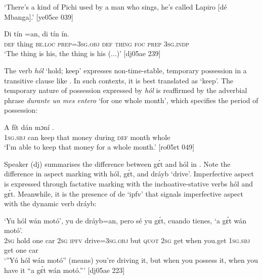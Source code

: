 \glt ‘There’s a kind of Pichi used by a man who sings, he’s called 
Lapiro [dé Mbanga].’ [ye05ce 039]
\z


\ea%
    \label{ex:key:822}
    \gll Di  tín        =an,    di  tín       ín.\\
\textsc{def}  thing  \textsc{be.loc}  \textsc{prep}=\textsc{3sg.obj}  \textsc{def}  \textsc{thing}  \textsc{foc}  \textsc{prep}  \textsc{3sg.indp}\\

\glt ‘The thing is his, the thing is his (...)’ [dj05ae 239]
\z

The verb \textit{hól} ‘hold; keep’ expresses non-time-stable, temporary possession in a transitive clause like . In such contexts, it is best translated as ‘keep’. The temporary nature of possession expressed by \textit{hól} is reaffirmed by the adverbial phrase \textit{durante un mes entero} ‘for one whole month’, which specifies the period of possession: 


\ea%
    \label{ex:key:823}
    \gll \MakeUppercase{A}   fít      dán    mɔní          .\\
\textsc{1sg.sbj}  can  keep  that    money  during  \textsc{def}  month  whole\\

\glt ‘I’m able to keep that money for a whole month.’ [ro05rt 049]
\z

Speaker (dj) summarises the difference between gɛ́t and hól in . Note the difference in aspect marking with hól, gɛ́t, and dráyb ‘drive’. Imperfective{\fff} aspect is expressed through factative{\fff} marking with the inchoative-stative verbs hól and gɛ́t. Meanwhile, it is the presence of de ‘ipfv’ that signals imperfective aspect with the dynamic verb dráyb:


\ea%
    \label{ex:key:824}
    \gll ‘Yu  hól  wán  motó’,  yu  de  dráyb=an,  pero  sé    yu  gɛ́t,
cuando  tienes,    ‘a    gɛ́t  wán    motó’.\\
\textsc{2sg}  hold  one  car    \textsc{2sg}  \textsc{ipfv}  drive=\textsc{3sg.obj}  but    \textsc{quot}    \textsc{2sg}  get
when  you.get    \textsc{1sg.sbj}  get  one    car\\

\glt ‘”Yú hól wán motó” (means) you’re driving it, but when you possess it, 
when you have it “a gɛ́t wán motó.”’ [dj05ae 223]
\z

